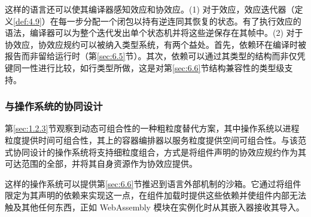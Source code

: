这样的语言还可以使其编译器感知效应和协效应。(1) 对于效应，效应迭代器（定义\ref{def:4.9}）在每一步分配一个闭包以持有逆连同其恢复的状态。有了执行效应的语法，编译器可以为整个迭代发出单个状态机并将这些逆保存在其帧中。(2) 对于协效应，协效应规约可以被纳入类型系统，有两个益处。首先，依赖环在编译时被报告而非留给运行时（第\ref{sec:6.5}节）。其次，依赖可以通过其类型的结构而非仅凭键同一性进行比较，如行类型所做\cite{ref28}，这是对第\ref{sec:6.6}节结构兼容性的类型级支持。

\subsubsection{与操作系统的协同设计}

第\ref{sec:1.2.3}节观察到动态可组合性的一种粗粒度替代方案，其中操作系统以进程粒度提供时间可组合性，其上的容器编排器以服务粒度提供空间可组合性。与该范式协同设计的操作系统将支持细粒度组合，方式是将组件声明的协效应规约作为其可达范围的全部，并将其自身资源作为协效应提供。

这样的操作系统可以提供第\ref{sec:6.6}节推迟到语言外部机制的沙箱。它通过将组件限定为其声明的依赖来实现这一点，在组件加载时提供这些依赖并使组件内部无法触及其他任何东西，正如 WebAssembly 模块在实例化时从其嵌入器接收其导入\cite{ref76}。